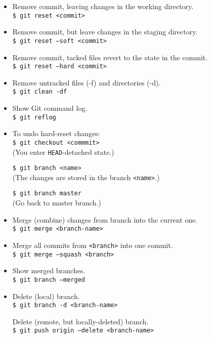 \begin{itemize}[label={-}, leftmargin=*]
\item Remove commit, leaving changes in the working directory.\\
{\tt \$ git reset <commit>}

\item Remove commit, but leave changes in the staging directory.\\
{\tt \$ git reset --soft <commit>}

\item Remove commit, tacked files revert to the state in the commit.\\
{\tt \$ git reset --hard <commit>}

\hr 

\item Remove untracked files (-f) and directories (-d).\\
{\tt \$ git clean -df}

\item Show Git command log.\\
{\tt \$ git reflog}

\item To undo hard-reset changes:\\
{\tt \$ git checkout <commmit>}\\
(You enter {\tt HEAD}-detached state.)

{\tt \$ git branch <name>}\\
(The changes are stored in the branch {\tt <name>}.)

{\tt \$ git branch master}\\
(Go back to master branch.)

\hr

\item Merge (combine) changes from branch into the current one.\\
{\tt \$ git merge <branch-name>}

\item Merge all commits from {\tt <branch>} into one commit.\\
{\tt \$ git merge --squash <branch>}

\item Show merged branches.\\
{\tt \$ git branch --merged}

\item Delete (local) branch.\\
{\tt \$ git branch -d <branch-name>}

Delete (remote, but locally-deleted) branch.\\
{\tt \$ git push origin --delete <branch-name>}


\end{itemize}
